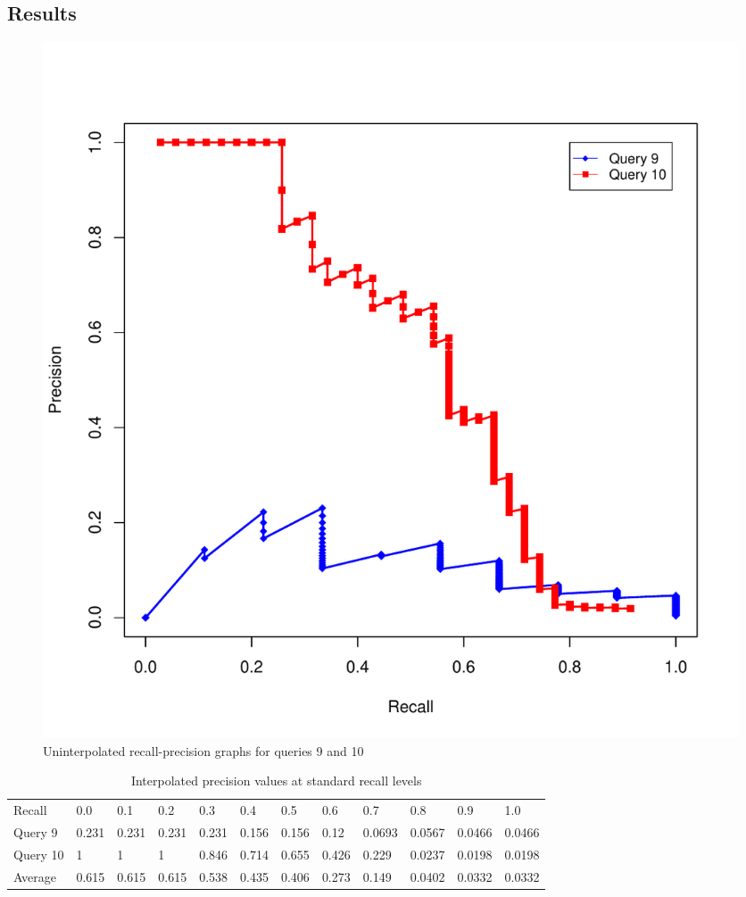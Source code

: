 \documentclass[10pt,letterpaper,bibliography=totoc]{scrartcl}
\begin{document}
\subsection{Results}
\begin{figure}[h!]
\centering
\label{fig:unint910}
\includegraphics[scale=.5]{unint910.pdf}
\caption{Uninterpolated recall-precision graphs for queries 9 and 10}
\end{figure}

\begin{table}[h!]
\centering
\begin{tabular}{ l l l l l l l l l l l l }
Recall & 0.0 & 0.1 & 0.2 & 0.3 & 0.4 & 0.5 & 0.6 & 0.7 & 0.8 & 0.9 & 1.0 \\
\cline{2-12}
Query 9 & 0.231 & 0.231 & 0.231 & 0.231 & 0.156 & 0.156 & 0.12 & 0.0693 & 0.0567 & 0.0466 & 0.0466 \\
\cline{2-12}
Query 10 & 1 & 1 & 1 & 0.846 & 0.714 & 0.655 & 0.426 & 0.229 & 0.0237 & 0.0198 & 0.0198 \\
\cline{2-12}
Average & 0.615 & 0.615 & 0.615 & 0.538 & 0.435 & 0.406 & 0.273 & 0.149 & 0.0402 & 0.0332 & 0.0332 \\
\cline{2-12}
\end{tabular}
\caption{Interpolated precision values at standard recall levels}
\label{tab:ipr}
\end{table}
\end{document}
